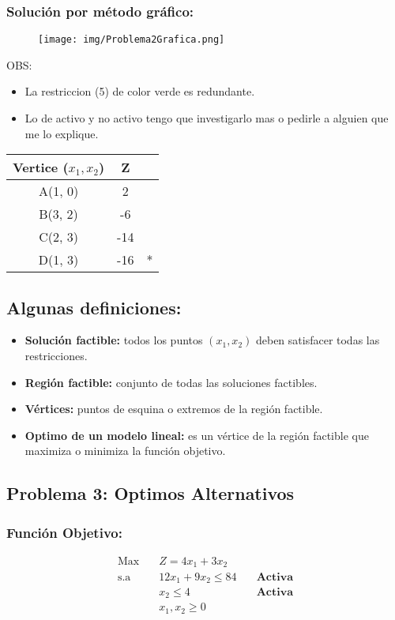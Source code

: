 \documentclass{templateNote}
\begin{document}
\subsubsection*{Solución por método gráfico:}
\begin{figure}[H]
    \centering
    \texttt{[image: img/Problema2Grafica.png]}
\end{figure}
OBS:
\begin{itemize}
    \item La restriccion (5) de color verde es redundante.
    \item Lo de activo y no activo tengo que investigarlo mas o pedirle a alguien que me lo explique.
\end{itemize}
\begin{center}
    \begin{tabular}{|c|c|c|}
        \hline
        \textbf{Vertice ($x_1,x_2$)} & Z &  \\ \hline
        A(1, 0) & 2 & \\ \hline
        B(3, 2) & -6 & \\ \hline
        C(2, 3) & -14 & \\ \hline
        D(1, 3) & -16 & * \\ \hline
    \end{tabular}
\end{center}
\subsection{Algunas definiciones:}
\begin{itemize}
    \item \textbf{Solución factible:} todos los puntos $(x_1, x_2)$ deben satisfacer todas las restricciones.
    \item \textbf{Región factible:} conjunto de todas las soluciones factibles.
    \item \textbf{Vértices:} puntos de esquina o extremos de la región factible.
    \item \textbf{Optimo de un modelo lineal:} es un vértice de la región factible que maximiza o minimiza la función objetivo.
\end{itemize}

\newpage
\subsection*{Problema 3: Optimos Alternativos}
\subsubsection*{Función Objetivo:}
\begin{equation*}
    \begin{aligned}
        \text{Max} \quad & Z = 4x_1 + 3x_2 \\
        \text{s.a} \quad & 12x_1 + 9x_2 \leq 84 \quad &\textbf{Activa} \\
        & x_2 \leq 4 \quad &\textbf{Activa} \\
        & x_1, x_2 \geq 0
    \end{aligned}
\end{equation*}
\end{document}
